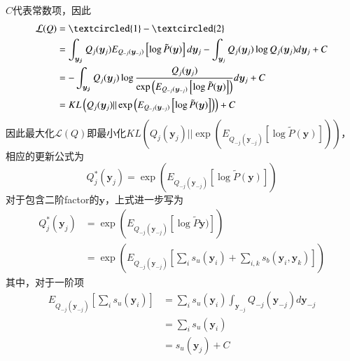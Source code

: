 $C$代表常数项，因此
\begin{equation}
    \begin{split}
        \mathcal{L}(Q)&=\textcircled{1}-\textcircled{2}\\
        &=\int_{\boldsymbol{y_j}}Q_j(\boldsymbol{y}_j)E_{Q_{-j}(\boldsymbol{y}_{-j})}\left[\log \tilde{P}(\boldsymbol{y}) \right] d\boldsymbol{y}_j-\int_{\boldsymbol{y}_j}Q_j(\boldsymbol{y}_j)\log Q_j(\boldsymbol{y}_j) d\boldsymbol{y}_j +C\\
        &=-\int_{\boldsymbol{y_j}}Q_j(\boldsymbol{y}_j)\log\frac{Q_j(\boldsymbol{y}_j)}{\exp\left(E_{Q_{-j}(\boldsymbol{y}_{-j})}\left[\log \tilde{P}(\boldsymbol{y}) \right]\right)} d\boldsymbol{y}_j +C\\
        &=KL\left(Q_j(\boldsymbol{y}_j)||\exp\left(E_{Q_{-j}(\boldsymbol{y}_{-j})}\left[\log \tilde{P}(\boldsymbol{y}) \right]\right)\right)+C
    \end{split}
\end{equation}
因此最大化$\mathcal{L}(Q)$即最小化$KL\left(Q_j(\boldsymbol{y}_j)||\exp\left(E_{Q_{-j}(\boldsymbol{y}_{-j})}\left[\log \tilde{P}(\boldsymbol{y}) \right]\right)\right)$，相应的更新公式为
\begin{equation}
    {Q^{\ast}_j(\boldsymbol{y}_j)}=\exp\left(E_{Q_{-j}(\boldsymbol{y}_{-j})}\left[\log \tilde{P}(\boldsymbol{y}) \right]\right)
\end{equation}
对于包含二阶factor的$\boldsymbol{y}$，上式进一步写为
\begin{equation}
    \begin{split}
        {Q^{\ast}_j(\boldsymbol{y}_j)}&=\exp\left(E_{Q_{-j}(\boldsymbol{y}_{-j})}\left[\log \tilde{P}\boldsymbol{y})\right]\right)\\
        &=\exp\left(E_{Q_{-j}(\boldsymbol{y}_{-j})}\left[\sum_i s_u(\boldsymbol{y}_i)+\sum_{i,k} s_b(\boldsymbol{y}_i,\boldsymbol{y}_k) \right]\right)
    \end{split}
\end{equation}
其中，对于一阶项
\begin{equation}
    \begin{split}
        E_{Q_{-j}(\boldsymbol{y}_{-j})}\left[\sum_i s_u(\boldsymbol{y}_i)\right]
        &=\sum_{i}s_u(\boldsymbol{y}_i) \int_{\boldsymbol{y}_{-j}} Q_{-j}(\boldsymbol{y}_{-j}) d\boldsymbol{y}_{-j}\\
        &=\sum_{i}s_u(\boldsymbol{y}_i)\\
        &=s_u(\boldsymbol{y}_j)+C
    \end{split}
\end{equation}
